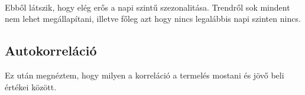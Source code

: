 \documentclass[11pt]{article}
\begin{document}
    \begin{center}
    \end{center}
    { \hspace*{\fill} \\}
    
    \begin{center}
    \end{center}
    { \hspace*{\fill} \\}
    
    \begin{center}
    \end{center}
    { \hspace*{\fill} \\}
    
    \begin{center}
    \end{center}
    { \hspace*{\fill} \\}
    
    \begin{center}
    \end{center}
    { \hspace*{\fill} \\}
    
    \begin{center}
    \end{center}
    { \hspace*{\fill} \\}
    
    Ebből látszik, hogy elég erős a napi szintű szezonalitása. Trendről sok
mindent nem lehet megállapítani, illetve főleg azt hogy nincs legalábbis
napi szinten nincs.

    \subsection{Autokorreláció}\label{autokorreluxe1ciuxf3}

    Ez után megnéztem, hogy milyen a korreláció a termelés mostani és jövő
beli értékei között.
\end{document}
